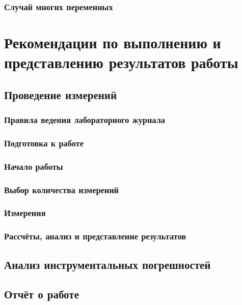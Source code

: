 \documentclass[12pt]{article}
\begin{document}
      \subsubsection{Случай многих переменных}

  \section{Рекомендации по выполнению и представлению результатов работы}

    \subsection{Проведение измерений}

      \subsubsection{Правила ведения лабораторного журнала}

      \subsubsection{Подготовка к работе}

      \subsubsection{Начало работы}

      \subsubsection{Выбор количества измерений}

      \subsubsection{Измерения}

      \subsubsection{Рассчёты, анализ и представление результатов}

    \subsection{Анализ инструментальных погрешностей}

    \subsection{Отчёт о работе}
\end{document}

